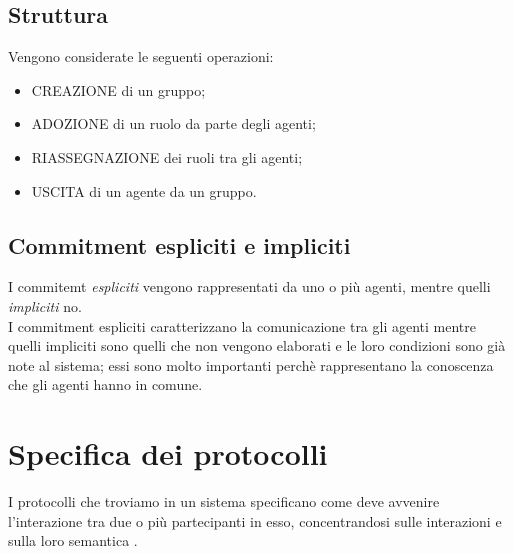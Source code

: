 \documentclass[a4paper,12pt]{report}
\begin{document}
\subsection{Struttura}
Vengono considerate le seguenti operazioni:
\begin{itemize}
    \item CREAZIONE di un gruppo;
    \item ADOZIONE di un ruolo da parte degli agenti;
    \item RIASSEGNAZIONE dei ruoli tra gli agenti;
    \item USCITA di un agente da un gruppo.
\end{itemize}
\subsection{Commitment espliciti e impliciti}
I commitemt \textit{espliciti} vengono rappresentati da uno o più agenti, mentre quelli \textit{impliciti} no.\\
I commitment espliciti caratterizzano la comunicazione tra gli agenti mentre quelli impliciti sono quelli che non vengono elaborati e le loro condizioni sono già note al sistema; essi sono molto importanti perchè rappresentano la conoscenza che gli agenti hanno in comune.
\newpage
\section{Specifica dei protocolli}
I protocolli che troviamo in un sistema specificano come deve avvenire l'interazione tra due o più partecipanti in esso, concentrandosi sulle interazioni e sulla loro semantica \cite{rif1}.
\end{document}

